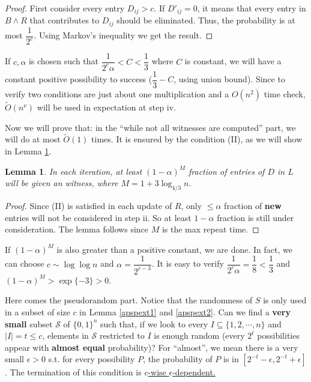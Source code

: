 \documentclass[12pt]{article}
\theoremstyle{plain}
\newtheorem{lemma}{Lemma}[section]
\begin{document}
\begin{proof}
First consider every entry $D_{ij}>c$. If $D'_{ij}=0$, it means that every entry in $B\land R$ that contributes to $D_{ij}$ should be eliminated. Thus, the probability is at most $\dfrac{1}{2^c}$. Using Markov's inequality we get the result.
\end{proof}

If $c,\alpha$ is chosen such that $\dfrac{1}{2^c\alpha}<C<\dfrac{1}{3}$ where $C$ is constant, we will have a constant positive possibility to success ($\dfrac{1}{3}-C$, using union bound). Since to verify two conditions are just about one multiplication and a $O(n^2)$ time check, $\tilde O(n^\nu)$ will be used in expectation at step iv. 

Now we will prove that: in the ``while not all witnesses are computed'' part, we will do at most $\tilde O(1)$ times. It is ensured by the condition (II), as we will show in Lemma \ref{apspext3}.

\begin{lemma}
\label{apspext3}
In each iteration, at least $(1-\alpha)^{M}$ fraction of entries of $D$ in $L$ will be given an witness, where $M=1+3\log_{4/3} n$.
\end{lemma}

\begin{proof}
Since (II) is satisfied in each update of $R$, only $\le \alpha$ fraction of \textbf{new} entries will not be considered in step ii. So at least $1-\alpha$ fraction is still under consideration. The lemma follows since $M$ is the max repeat time.
\end{proof}

If $(1-\alpha)^M$ is also greater than a positive constant, we are done. In fact, we can choose $c\sim\log \log n$ and $\alpha=\dfrac{1}{2^{c-3}}$. It is easy to verify $\dfrac{1}{2^c\alpha}=\dfrac{1}{8}<\dfrac{1}{3}$ and $(1-\alpha)^M>\exp\{-3\}>0$.

Here comes the pseudorandom part. Notice that the randomness of $S$ is only used in a subset of size $c$ in Lemma \ref{apspext1} and \ref{apspext2}. Can we find a \textbf{very small} subset $\mathcal{S}$ of $\{0,1\}^n$ such that, if we look to every $I\subseteq\{1,2,\cdots,n\}$ and $|I|=t\le c$, elements in $\mathcal{S}$ restricted to $I$ is enough random (every $2^t$ possibilities appear with \textbf{almost equal} probability)? For ``almost'', we mean there is a very small $\epsilon>0$ s.t. for every possibility $P$, the probability of $P$ is in $[2^{-t}-\epsilon,2^{-t}+\epsilon]$. The termination of this condition is \underline{$c$-wise $\epsilon$-dependent.}
\end{document}

